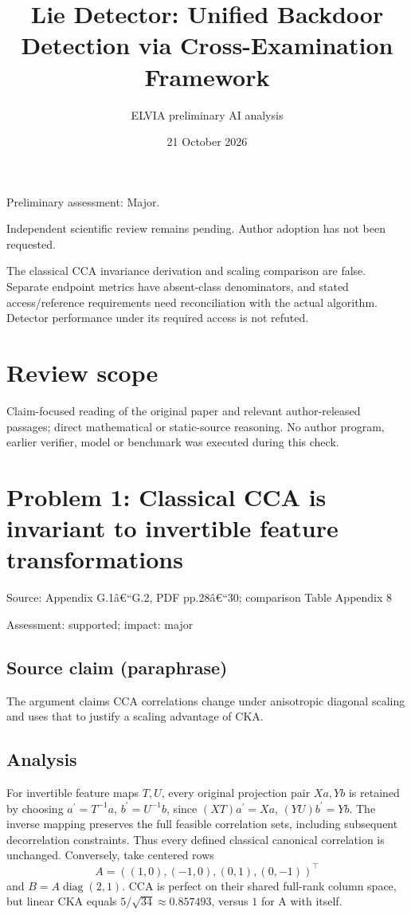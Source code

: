 \documentclass[11pt]{article}
\begin{document}
\title{Lie Detector: Unified Backdoor Detection via Cross-Examination Framework}

\author{ELVIA preliminary AI analysis}\date{21 October 2026}\maketitle

Preliminary assessment: Major.\par

Independent scientific review remains pending. Author adoption has not been requested.

The classical CCA invariance derivation and scaling comparison are false. Separate endpoint metrics have absent-class denominators, and stated access/reference requirements need reconciliation with the actual algorithm. Detector performance under its required access is not refuted.

\section*{Review scope}

Claim-focused reading of the original paper and relevant author-released passages; direct mathematical or static-source reasoning. No author program, earlier verifier, model or benchmark was executed during this check.

\section*{Problem 1: Classical CCA is invariant to invertible feature transformations}

Source: Appendix G.1â€“G.2, PDF pp.28â€“30; comparison Table Appendix 8

Assessment: supported; impact: major

\subsection*{Source claim (paraphrase)}

The argument claims CCA correlations change under anisotropic diagonal scaling and uses that to justify a scaling advantage of CKA.

\subsection*{Analysis}

For invertible feature maps \(T,U\), every original projection pair \(Xa,Yb\) is retained by choosing \(a^\prime=T^{-1}a\), \(b^\prime=U^{-1}b\), since \((XT)a^\prime=Xa\), \((YU)b^\prime=Yb\). The inverse mapping preserves the full feasible correlation sets, including subsequent decorrelation constraints. Thus every defined classical canonical correlation is unchanged. Conversely, take centered rows \[A=((1,0),(-1,0),(0,1),(0,-1))^\top\] and \(B=A\operatorname{diag}(2,1)\). CCA is perfect on their shared full-rank column space, but linear CKA equals \(5/\sqrt{34}\approx0.857493\), versus \(1\) for A with itself.
\end{document}
